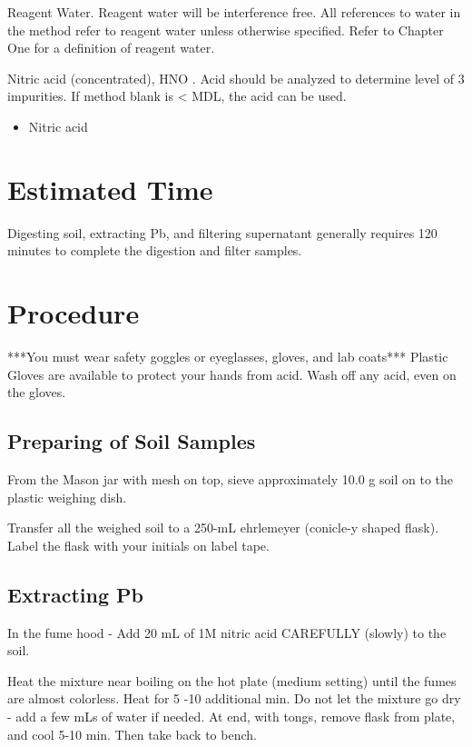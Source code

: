 \documentclass[12pt]{../SOP3_alpha}
\begin{document}
\NP Reagent Water. Reagent water will be interference free. All references to water in
the method refer to reagent water unless otherwise specified. Refer to Chapter One for a definition
of reagent water.

\NP Nitric acid (concentrated), HNO . Acid should be analyzed to determine level of 3
impurities. If method blank is < MDL, the acid can be used. 

\begin{itemize}
  \item Nitric acid
\end{itemize}

\section{Estimated Time}

\NP Digesting soil, extracting Pb, and filtering supernatant  generally requires 120 minutes to complete the digestion and filter samples.

\section{Procedure}

***You must wear safety goggles or eyeglasses, gloves, and lab coats***
Plastic Gloves are available to protect your hands from acid. Wash off any acid, even on the gloves.

\subsection{Preparing of Soil Samples}

\NP From the Mason jar with mesh on top, sieve approximately 10.0 g soil on to the plastic weighing dish.

\NP Transfer all the weighed soil to a 250-mL ehrlemeyer (conicle-y shaped flask). Label the flask with your initials on label tape. 

\subsection{Extracting Pb}

\NP In the fume hood - Add 20 mL of 1M nitric acid CAREFULLY (slowly) to the soil.

\NP Heat the mixture near boiling on the hot plate (medium setting) until the fumes are almost colorless. Heat for 5 -10 additional min. Do not let the mixture go dry - add a few mLs of water if needed. At end, with tongs, remove flask from plate, and cool 5-10 min. Then take back to bench.
\end{document}
